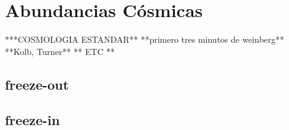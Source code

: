 \chapter{Abundancias Cósmicas}
***COSMOLOGIA ESTANDAR**
**primero tres minutos de weinberg**
**Kolb, Turner**
** ETC **

\section{freeze-out}
\section{freeze-in}